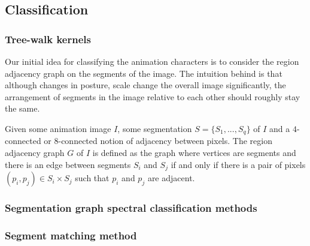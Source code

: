 \subsection{Classification}
\subsubsection{Tree-walk kernels}
Our initial idea for classifying the animation characters is to consider the region adjacency graph on the segments of the image. The intuition behind is that although changes in posture, scale change the overall image significantly, the arrangement of segments in the image relative to each other should roughly stay the same. 

Given some animation image $I$, some segmentation $S = \{S_1, ..., S_q\}$ of $I$ and a $4$-connected or $8$-connected notion of adjacency between pixels. The region adjacency graph $G$ of $I$ is defined as the graph where vertices are segments and there is an edge between segments $S_i$ and $S_j$ if and only if there is a pair of pixels $(p_i, p_j) \in S_i \times S_j$ such that $p_i$ and $p_j$ are adjacent.

\subsubsection{Segmentation graph spectral classification methods}

\subsubsection{Segment matching method}
